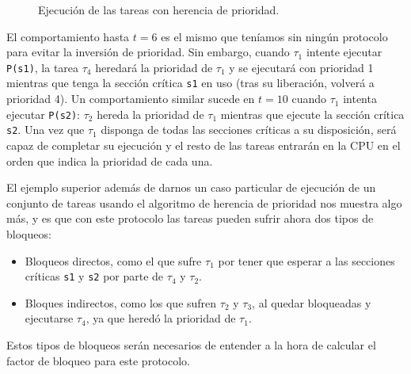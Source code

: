 \begin{ejemplo}
\begin{figure}[H]
        \caption{Ejecución de las tareas con herencia de prioridad.}
        \label{fig:herencia_prio}
    \end{figure}
    El comportamiento hasta $t=6$ es el mismo que teníamos sin ningún protocolo para evitar la inversión de prioridad. Sin embargo, cuando $\tau_1$ intente ejecutar \verb|P(s1)|, la tarea $\tau_4$ heredará la prioridad de $\tau_1$ y se ejecutará con prioridad 1 mientras que tenga la sección crítica \verb|s1| en uso (tras su liberación, volverá a prioridad 4). Un comportamiento similar sucede en $t=10$ cuando $\tau_1$ intenta ejecutar \verb|P(s2)|: $\tau_2$ hereda la prioridad de $\tau_1$ mientras que ejecute la sección crítica \verb|s2|. Una vez que $\tau_1$ disponga de todas las secciones críticas a su disposición, será capaz de completar su ejecución y el resto de las tareas entrarán en la CPU en el orden que indica la prioridad de cada una.
\end{ejemplo}

El ejemplo superior además de darnos un caso particular de ejecución de un conjunto de tareas usando el algoritmo de herencia de prioridad nos muestra algo más, y es que con este protocolo las tareas pueden sufrir ahora dos tipos de bloqueos:
\begin{itemize}
    \item Bloqueos directos, como el que sufre $\tau_1$ por tener que esperar a las secciones críticas \verb|s1| y \verb|s2| por parte de $\tau_4$ y $\tau_2$.
    \item Bloques indirectos, como los que sufren $\tau_2$ y $\tau_3$, al quedar bloqueadas y ejecutarse $\tau_4$, ya que heredó la prioridad de $\tau_1$.
\end{itemize}
Estos tipos de bloqueos serán necesarios de entender a la hora de calcular el factor de bloqueo para este protocolo.\\

